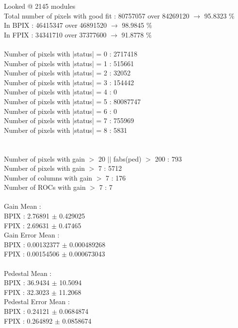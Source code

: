 Looked @ 2145 modules \\
Total number of pixels with good fit : 80757057 over 84269120 $\rightarrow$  95.8323 \% \\
In BPIX : 46415347 over 46891520 $\rightarrow$ 98.9845 \% \\
In FPIX : 34341710 over 37377600 $\rightarrow$ 91.8778 \% \\
 \\
Number of pixels with |status| = 0 :  2717418 \\
Number of pixels with |status| = 1 :   515661 \\
Number of pixels with |status| = 2 :    32052 \\
Number of pixels with |status| = 3 :   154442 \\
Number of pixels with |status| = 4 :        0 \\
Number of pixels with |status| = 5 : 80087747 \\
Number of pixels with |status| = 6 :        0 \\
Number of pixels with |status| = 7 :   755969 \\
Number of pixels with |status| = 8 :     5831 \\
 \\
 \\
Number of  pixels with gain $>$ 20 $||$ fabs(ped) $>$ 200 :   793 \\
Number of  pixels with gain $>$ 7 :   5712 \\
Number of columns with gain $>$ 7 :   176 \\
Number of    ROCs with gain $>$ 7 :   7 \\
 \\
Gain Mean :  \\
BPIX : 2.76891 $\pm$ 0.429025 \\
FPIX : 2.69631 $\pm$ 0.47465 \\
Gain Error Mean :  \\
BPIX : 0.00132377 $\pm$ 0.000489268 \\
FPIX : 0.00154506 $\pm$ 0.000673043 \\
 \\
Pedestal Mean :  \\
BPIX : 36.9434 $\pm$ 10.5094 \\
FPIX : 32.3023 $\pm$ 11.2068 \\
Pedestal Error Mean :  \\
BPIX : 0.24121 $\pm$ 0.0684874 \\
FPIX : 0.264892 $\pm$ 0.0858674 \\
 \\
